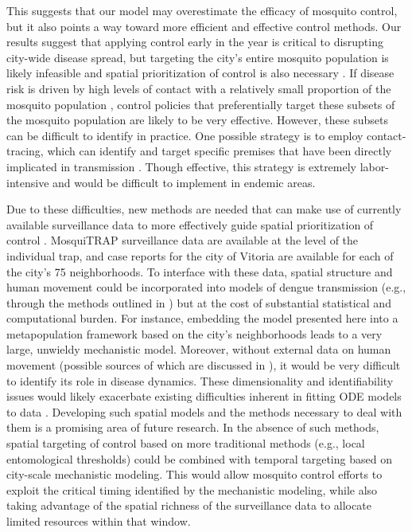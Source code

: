 \documentclass[10pt,letterpaper]{article}
\begin{document}
This suggests that our model may overestimate the efficacy of mosquito control, but it also points a way toward more efficient and effective control methods.
Our results suggest that applying control early in the year is critical to disrupting city-wide disease spread, but targeting the city's entire mosquito population is likely infeasible and spatial prioritization of control is also necessary \cite{Pepin2015}.
If disease risk is driven by high levels of contact with a relatively small proportion of the mosquito population \cite{Yoon2012}, control policies that preferentially target these subsets of the mosquito population are likely to be very effective.
However, these subsets can be difficult to identify in practice.
One possible strategy is to employ contact-tracing, which can identify and target specific premises that have been directly implicated in transmission \cite{Vazquez-Prokopec2017}.
Though effective, this strategy is extremely labor-intensive and would be difficult to implement in endemic areas.

Due to these difficulties, new methods are needed that can make use of currently available surveillance data to more effectively guide spatial prioritization of control \cite{Pepin2015}.
MosquiTRAP surveillance data are available at the level of the individual trap, and case reports for the city of Vitoria are available for each of the city's 75 neighborhoods.
To interface with these data, spatial structure and human movement could be incorporated into models of dengue transmission  (e.g., through the methods outlined in \cite{Cosner2015}) but at the cost of substantial statistical and computational burden.
For instance, embedding the model presented here into a metapopulation framework based on the city's neighborhoods leads to a very large, unwieldy mechanistic model.
Moreover, without external data on human movement (possible sources of which are discussed in \cite{Stoddard2009}), it would be very difficult to identify its role in disease dynamics.
These dimensionality and identifiability issues would likely exacerbate existing difficulties inherent in fitting ODE models to data \cite{Girolami2008, Calderhead2011}.
Developing such spatial models and the methods necessary to deal with them is a promising area of future research.
In the absence of such methods, spatial targeting of control based on more traditional methods (e.g., local entomological thresholds) could be combined with temporal targeting based on city-scale mechanistic modeling.
This would allow mosquito control efforts to exploit the critical timing identified by the mechanistic modeling, while also taking advantage of the spatial richness of the surveillance data to allocate limited resources within that window.
\end{document}
